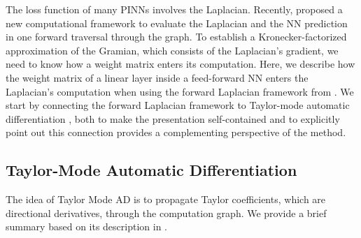 The loss function of many PINNs involves the Laplacian.
Recently, \cite{li2023forward} proposed a new computational framework to evaluate the Laplacian and the NN prediction in one forward traversal through the graph.
To establish a Kronecker-factorized approximation of the Gramian, which consists of the Laplacian's gradient, we need to know how a weight matrix enters its computation.
Here, we describe how the weight matrix of a linear layer inside a feed-forward NN enters the Laplacian's computation when using the forward Laplacian framework from \cite{li2023forward}.
We start by connecting the forward Laplacian framework to Taylor-mode automatic differentiation \citep{griewank2008evaluating,bettencourt2019taylor}, both to make the presentation self-contained and to explicitly point out this connection provides a complementing perspective of the method.

\subsection{Taylor-Mode Automatic Differentiation}
The idea of Taylor Mode AD is to propagate Taylor coefficients, which are directional derivatives, through the computation graph. We provide a brief summary based on its description in \cite{bettencourt2019taylor}.


